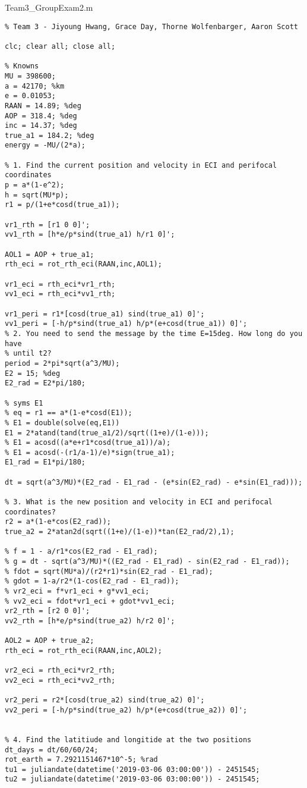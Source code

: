 Team3\_GroupExam2.m
\begin{lstlisting}[frame=lines,style=Matlab-editor,basicstyle = \mlttfamily]
%% AE 313 Group Exam 2
% Team 3 - Jiyoung Hwang, Grace Day, Thorne Wolfenbarger, Aaron Scott

clc; clear all; close all;

% Knowns
MU = 398600;
a = 42170; %km
e = 0.01053;
RAAN = 14.89; %deg
AOP = 318.4; %deg
inc = 14.37; %deg
true_a1 = 184.2; %deg
energy = -MU/(2*a);

% 1. Find the current position and velocity in ECI and perifocal coordinates
p = a*(1-e^2);
h = sqrt(MU*p);
r1 = p/(1+e*cosd(true_a1));

vr1_rth = [r1 0 0]';
vv1_rth = [h*e/p*sind(true_a1) h/r1 0]';

AOL1 = AOP + true_a1;
rth_eci = rot_rth_eci(RAAN,inc,AOL1);

vr1_eci = rth_eci*vr1_rth;
vv1_eci = rth_eci*vv1_rth;

vr1_peri = r1*[cosd(true_a1) sind(true_a1) 0]';
vv1_peri = [-h/p*sind(true_a1) h/p*(e+cosd(true_a1)) 0]';
% 2. You need to send the message by the time E=15deg. How long do you have
% until t2?
period = 2*pi*sqrt(a^3/MU);
E2 = 15; %deg
E2_rad = E2*pi/180;

% syms E1
% eq = r1 == a*(1-e*cosd(E1));
% E1 = double(solve(eq,E1))
E1 = 2*atand(tand(true_a1/2)/sqrt((1+e)/(1-e)));
% E1 = acosd((a*e+r1*cosd(true_a1))/a);
% E1 = acosd(-(r1/a-1)/e)*sign(true_a1);
E1_rad = E1*pi/180;

dt = sqrt(a^3/MU)*(E2_rad - E1_rad - (e*sin(E2_rad) - e*sin(E1_rad)));

% 3. What is the new position and velocity in ECI and perifocal coordinates?
r2 = a*(1-e*cos(E2_rad));
true_a2 = 2*atan2d(sqrt((1+e)/(1-e))*tan(E2_rad/2),1);

% f = 1 - a/r1*cos(E2_rad - E1_rad);
% g = dt - sqrt(a^3/MU)*((E2_rad - E1_rad) - sin(E2_rad - E1_rad));
% fdot = sqrt(MU*a)/(r2*r1)*sin(E2_rad - E1_rad);
% gdot = 1-a/r2*(1-cos(E2_rad - E1_rad));
% vr2_eci = f*vr1_eci + g*vv1_eci;
% vv2_eci = fdot*vr1_eci + gdot*vv1_eci;
vr2_rth = [r2 0 0]';
vv2_rth = [h*e/p*sind(true_a2) h/r2 0]';

AOL2 = AOP + true_a2;
rth_eci = rot_rth_eci(RAAN,inc,AOL2);

vr2_eci = rth_eci*vr2_rth;
vv2_eci = rth_eci*vv2_rth;

vr2_peri = r2*[cosd(true_a2) sind(true_a2) 0]';
vv2_peri = [-h/p*sind(true_a2) h/p*(e+cosd(true_a2)) 0]';


% 4. Find the latitiude and longitide at the two positions
dt_days = dt/60/60/24;
rot_earth = 7.2921151467*10^-5; %rad
tu1 = juliandate(datetime('2019-03-06 03:00:00')) - 2451545;
tu2 = juliandate(datetime('2019-03-06 03:00:00')) - 2451545;


\end{lstlisting}
